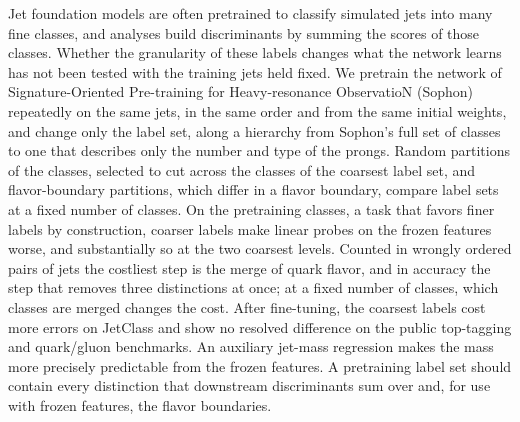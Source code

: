 Jet foundation models are often pretrained to classify simulated jets into many fine classes, and analyses
build discriminants by summing the scores of those classes. Whether the granularity of these labels
changes what the network learns has not been tested with the training jets held fixed. We pretrain the
network of Signature-Oriented Pre-training for Heavy-resonance ObservatioN (Sophon) repeatedly on the same
jets, in the same order and from the same initial weights, and change only the label set, along a
hierarchy from Sophon's full set of classes to one that describes only the number and type of the prongs.
Random partitions of the classes, selected to cut across the classes of the coarsest label set, and
flavor-boundary partitions, which differ in a flavor boundary, compare label sets at a fixed number of classes. On
the pretraining classes, a task that favors finer labels by construction, coarser labels make linear probes on the
frozen features worse, and substantially so at the two coarsest levels. Counted in wrongly ordered pairs of jets the costliest step is the merge of quark flavor, and in
accuracy the step that removes three distinctions at once; at a fixed number of classes, which classes
are merged changes the cost. After fine-tuning, the coarsest labels cost  more errors on JetClass and show no resolved difference on the public top-tagging and quark/gluon
benchmarks. An auxiliary
jet-mass regression makes the mass more precisely predictable from the frozen features. A pretraining
label set should contain every distinction that downstream discriminants sum over and, for use with frozen
features, the flavor boundaries.
